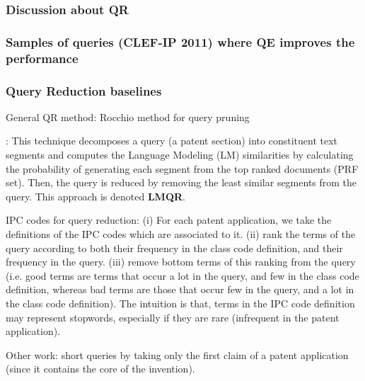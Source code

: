 \documentclass[xcolor=x11names,compress]{beamer}
\renewcommand{\(}{\begin{columns}}
\renewcommand{\)}{\end{columns}}
\newcommand{\<}[1]{\begin{column}{#1}}
\renewcommand{\>}{\end{column}}
\begin{document}
\begin{frame}
\frametitle{Discussion about QR}
\end{frame}




\begin{frame}
\frametitle{Samples of queries (CLEF-IP 2011) where QE improves
the performance}


\end{frame}



\begin{frame}
\frametitle{Query Reduction baselines}

General QR method: Rocchio method for query pruning

\cite{Ganguly2011}: This technique decomposes a query
(a patent section) into constituent text segments and computes the
Language Modeling (LM) similarities by calculating the probability
of generating each segment from the top ranked documents (PRF set).
Then, the query is reduced by removing the least similar segments
from the query. This approach is denoted \textbf{LMQR}. 

IPC codes for query reduction: 
(i) For each patent application, we take the definitions of the IPC codes which are associated to it. 
(ii) rank the terms of the query according to both their frequency in the class
code definition, and their frequency in the query.
(iii) remove bottom terms of this ranking from the query (i.e. good terms
are terms that occur a lot in the query, and few in the class code
definition, whereas bad terms are those that occur few in the query,
and a lot in the class code definition). 
The intuition is that, terms in the IPC code definition may represent \textquotedbl{}stopwords\textquotedbl{}, especially if they are rare (infrequent in the patent application).

Other work: \cite{Mahdabi2013} short queries by taking only the first claim of a patent application (since it contains the core of the invention).
\end{frame}
\end{document}
